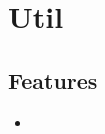 \section{Util}
\label{module:Util}
\ClearAPI
\TODO
\subsection{Features}
\begin{itemize}
	\item \TODO
\end{itemize}